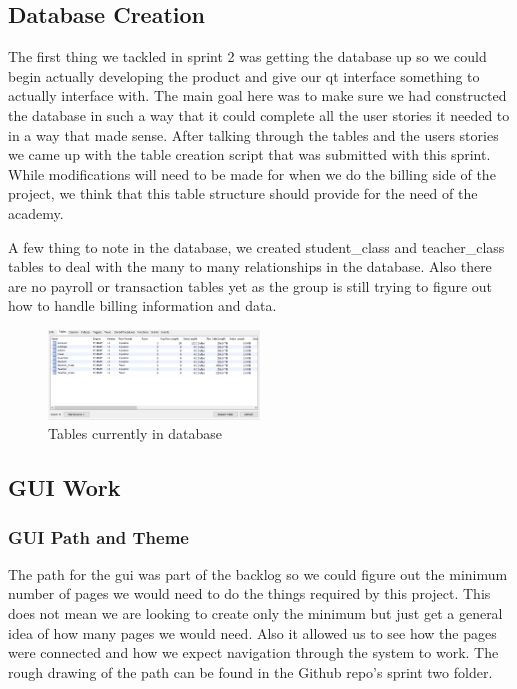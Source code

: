 \subsection{Database Creation}

The first thing we tackled in sprint 2 was getting the database up so we could begin actually developing the product and give our qt interface something to actually interface with. The main goal here was to make sure we had constructed the database in such a way that it could complete all the user stories it needed to in a way that made sense. After talking through the tables and the users stories we came up with the table creation script that was submitted with this sprint. While modifications will need to be made for when we do the billing side of the project, we think that this table structure should provide for the need of the academy.

A few thing to note in the database, we created student\_class and teacher\_class tables to deal with the many to many relationships in the database. Also there are no payroll or transaction tables yet as the group is still trying to figure out how to handle billing information and data.


\begin{figure}
\caption{Tables currently in database}
\centering
\includegraphics[width=0.5\textwidth]{database_tables}
\end{figure}

\subsection{GUI Work}

\subsubsection{GUI Path and Theme}

The path for the gui was part of the backlog so we could figure out the minimum number of pages we would need to do the things required by this project. This does not mean we are looking to create only the minimum but just get a general idea of how many pages we would need. Also it allowed us to see how the pages were connected and how we expect navigation through the system to work. The rough drawing of the path can be found in the Github repo's sprint two folder.

